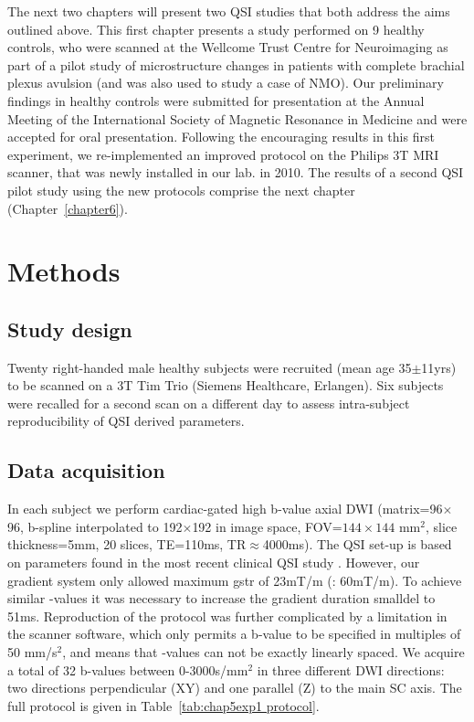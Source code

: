 The next two chapters will present two \gls{QSI} studies that both address the aims outlined above. This first chapter presents a study performed on 9 healthy controls, who were scanned at the Wellcome Trust Centre for Neuroimaging as part of a pilot study of microstructure changes in patients with complete brachial plexus avulsion \citep{Kachramanoglou:2012} (and was also used to study a case of \gls{NMO}). Our preliminary findings in healthy controls were submitted for presentation at the Annual Meeting of the International Society of Magnetic Resonance in Medicine and were accepted for oral presentation. Following the encouraging results in this first experiment, we re-implemented an improved protocol on the Philips 3T MRI scanner, that was newly installed in our lab. in 2010. The results of a second \gls{QSI} pilot study using the new protocols comprise the next chapter (Chapter~\ref{chapter6}).

\section{Methods}
\label{sec:chapter 5 exp1 methods}
\subsection{Study design}
Twenty right-handed male healthy subjects were recruited (mean age 35$\pm$11yrs) to be scanned on a 3T Tim Trio (Siemens Healthcare, Erlangen). Six subjects were recalled for a second scan on a different day to assess intra-subject reproducibility of \gls{QSI} derived parameters.

\subsection{Data acquisition}
In each subject we perform cardiac-gated high b-value axial {\gls{DWI}} (matrix=96$\times$96, b-spline interpolated to 192$\times$192 in image space, FOV=$144\times144$ mm$^2$, slice thickness=5mm, 20 slices, TE=110ms, TR$\approx$4000ms). The \gls{QSI} set-up is based on parameters found in the most recent clinical \gls{QSI} study \citep{Farrell:2008}. However, our gradient system only allowed maximum \gls{gstr} of 23mT/m (\citet{Farrell:2008}: 60mT/m). To achieve similar {\q}-values it was necessary to increase the gradient duration \gls{smalldel} to 51ms. Reproduction of the protocol was further complicated by a limitation in the scanner software, which only permits a b-value to be specified in multiples of 50 mm/s$^2$, and means that {\q}-values can not be exactly linearly spaced. We acquire a total of 32 b-values between 0-3000s/mm$^2$ in three different {\gls{DWI}} directions: two directions perpendicular (XY) and one parallel (Z) to the main {\gls{SC}} axis. The full protocol is given in Table~\ref{tab:chap5exp1 protocol}.

